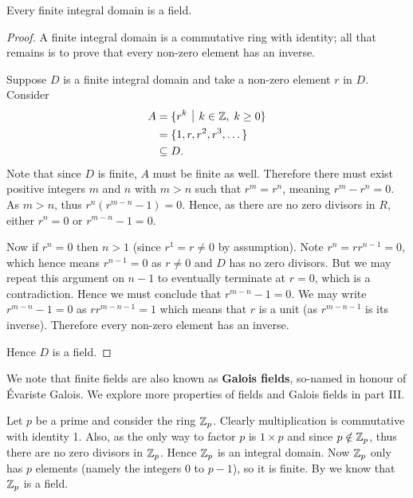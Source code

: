 \begin{theorem}\label{thrm-finite-integral-domain-is-field}
    Every finite integral domain is a field.
\end{theorem}
\begin{proof}
    A finite integral domain is a commutative ring with identity; all that remains is to prove that every non-zero element has an inverse.

    Suppose $D$ is a finite integral domain and take a non-zero element $r$ in $D$. Consider
    \begin{align*}
        A &= \{r^k \vert k \in \Z,\;k\geq 0\}\\
        &= \{1, r, r^2, r^3, \dots\}\\
        &\subseteq D.
    \end{align*}
    Note that since $D$ is finite, $A$ must be finite as well. Therefore there must exist positive integers $m$ and $n$ with $m > n$ such that $r^m = r^n$, meaning $r^m - r^n = 0$. As $m > n$, thus $r^n\left(r^{m-n}-1\right) = 0$. Hence, as there are no zero divisors in $R$, either $r^n = 0$ or $r^{m-n} - 1 = 0$.

    Now if $r^n = 0$ then $n > 1$ (since $r^1 = r \neq 0$ by assumption). Note $r^n = rr^{n-1} = 0$, which hence means $r^{n-1} = 0$ as $r \neq 0$ and $D$ has no zero divisors. But we may repeat this argument on $n - 1$ to eventually terminate at $r = 0$, which is a contradiction. Hence we must conclude that $r^{m-n} - 1 = 0$. We may write $r^{m-n}-1 = 0$ as $rr^{m-n-1} = 1$ which means that $r$ is a unit (as $r^{m-n-1}$ is its inverse). Therefore every non-zero element has an inverse.

    Hence $D$ is a field.
\end{proof}

\begin{remark}
    We note that finite fields are also known as \textbf{Galois fields}, so-named in honour of \'Evariste Galois. We explore more properties of fields and Galois fields in part III.
\end{remark}

\begin{example}\label{example-Zp-is-field}
    Let $p$ be a prime and consider the ring $\mathbb{Z}_p$. Clearly multiplication is commutative with identity 1. Also, as the only way to factor $p$ is $1 \times p$ and since $p \notin \mathbb{Z}_p$, thus there are no zero divisors in $\mathbb{Z}_p$. Hence $\mathbb{Z}_p$ is an integral domain. Now $\mathbb{Z}_p$ only has $p$ elements (namely the integers 0 to $p - 1$), so it is finite. By  we know that $\mathbb{Z}_p$ is a field.
\end{example}

